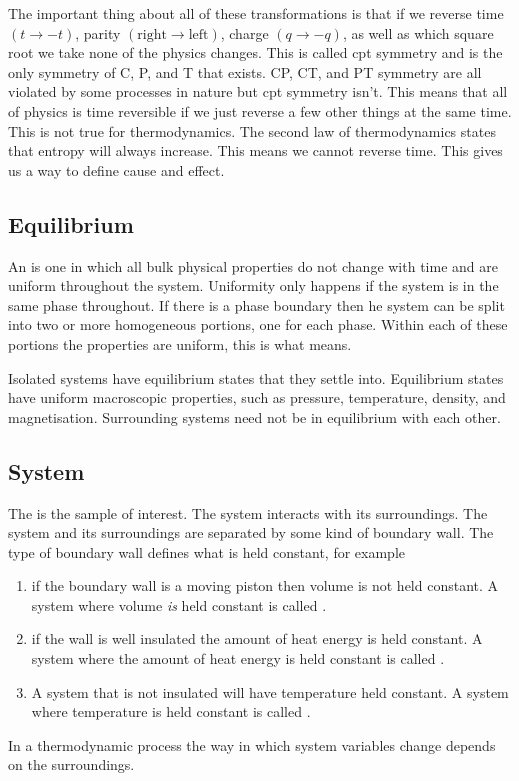     The important thing about all of these transformations is that if we reverse time \((t \to -t)\), parity \((\text{right}\to\text{left})\), charge \((q\to-q)\), as well as which square root we take none of the physics changes.
    This is called \acrfull{cpt} symmetry and is the only symmetry of C, P, and T that exists.
    CP, CT, and PT symmetry are all violated by some processes in nature but \acrshort{cpt} symmetry isn't.
    This means that all of physics is time reversible if we just reverse a few other things at the same time.
    This is not true for thermodynamics.
    The second law of thermodynamics states that entropy will always increase.
    This means we cannot reverse time.
    This gives us a way to define cause and effect.
    
    \subsection{Equilibrium}
    An  is one in which all bulk physical properties do not change with time and are uniform throughout the system.
    Uniformity only happens if the system is in the same phase throughout.
    If there is a phase boundary then he system can be split into two or more homogeneous portions, one for each phase.
    Within each of these portions the properties are uniform, this is what  means.
    
    Isolated systems have equilibrium states that they settle into.
    Equilibrium states have uniform macroscopic properties, such as pressure, temperature, density, and magnetisation.
    Surrounding systems need not be in equilibrium with each other.
    
    \subsection{System}
    The  is the sample of interest.
    The system interacts with its surroundings.
    The system and its surroundings are separated by some kind of boundary wall.
    The type of boundary wall defines what is held constant, for example
    \begin{enumerate}
        \item if the boundary wall is a moving piston then volume is not held constant.
        A system where volume \emph{is} held constant is called .
        \item if the wall is well insulated the amount of heat energy is held constant.
        A system where the amount of heat energy is held constant is called .
        \item A system that is not insulated will have temperature held constant.
        A system where temperature is held constant is called .
    \end{enumerate}
    In a thermodynamic process the way in which system variables change depends on the surroundings.
    
